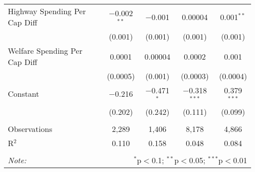 \begin{table}[!htbp]
\begin{tabular}{@{\extracolsep{5pt}}lcccc}
  Highway Spending Per Cap Diff & $-$0.002$^{**}$ & $-$0.001 & 0.00004 & 0.001$^{**}$ \\ 
  & (0.001) & (0.001) & (0.001) & (0.001) \\ 
  Welfare Spending Per Cap Diff & 0.0001 & 0.00004 & 0.0002 & 0.001 \\ 
  & (0.0005) & (0.001) & (0.0003) & (0.0004) \\ 
  Constant & $-$0.216 & $-$0.471$^{*}$ & $-$0.318$^{***}$ & 0.379$^{***}$ \\ 
  & (0.202) & (0.242) & (0.111) & (0.099) \\ 
 \hline \\[-1.8ex] 
Observations & 2,289 & 1,406 & 8,178 & 4,866 \\ 
R$^{2}$ & 0.110 & 0.158 & 0.048 & 0.084 \\ 
\hline 
\hline \\[-1.8ex] 
\textit{Note:}  & \multicolumn{4}{r}{$^{*}$p$<$0.1; $^{**}$p$<$0.05; $^{***}$p$<$0.01} \\ 
\end{tabular} 
\end{table} 
